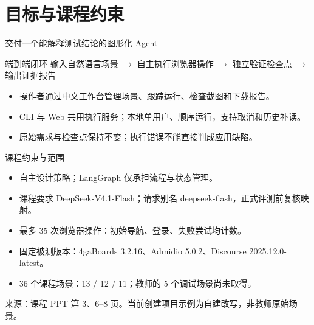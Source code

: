 \section{目标与课程约束}
\begin{frame}{交付一个能解释测试结论的图形化 Agent}
\begin{block}{端到端闭环}
输入自然语言场景 $\rightarrow$ 自主执行浏览器操作 $\rightarrow$ 独立验证检查点 $\rightarrow$ 输出证据报告
\end{block}
\begin{itemize}
\item 操作者通过中文工作台管理场景、跟踪运行、检查截图和下载报告。
\item CLI 与 Web 共用执行服务；本地单用户、顺序运行，支持取消和历史补读。
\item 原始需求与检查点保持不变；执行错误不能直接判成应用缺陷。
\end{itemize}
\end{frame}
\begin{frame}{课程约束与范围}
\begin{itemize}
\item 自主设计策略；LangGraph 仅承担流程与状态管理。
\item 课程要求 DeepSeek-V4.1-Flash；请求别名 deepseek-flash，正式评测前复核映射。
\item 最多 35 次浏览器操作：初始导航、登录、失败尝试均计数。
\item 固定被测版本：4gaBoards 3.2.16、Admidio 5.0.2、Discourse 2025.12.0-latest。
\item 36 个课程场景：13 / 12 / 11；教师的 5 个调试场景尚未取得。
\end{itemize}
\footnotesize 来源：课程 PPT 第 3、6--8 页。当前创建项目示例为自建改写，非教师原始场景。
\end{frame}
